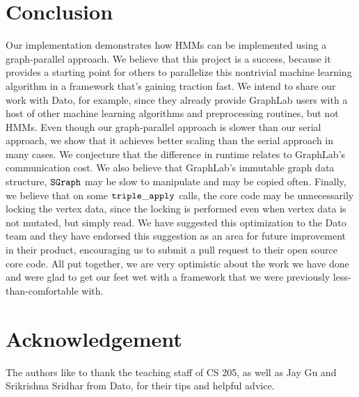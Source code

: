\section{Conclusion}

Our implementation demonstrates how HMMs can be implemented using a
graph-parallel approach.  We believe that this project is a success, because it provides a starting point for others to parallelize this nontrivial machine learning algorithm in a framework that's gaining traction fast.   We intend to share our work with Dato, for example, since they already provide GraphLab users with a host of other machine learning algorithms and preprocessing routines, but not HMMs.  Even though our graph-parallel approach is slower than
our serial approach, we show that it achieves better scaling than the serial
approach in many cases. We conjecture that the difference in runtime relates to GraphLab's communication cost.  We also believe that GraphLab's immutable graph data structure, $\tt{SGraph}$ may be slow to manipulate and may be copied often.  Finally, we  believe that on some $\tt{triple\_apply}$ calls, the core code may be unnecessarily locking the vertex data, since the locking is performed even when vertex data is not mutated, but simply read.   We have suggested this optimization to the Dato team and they have endorsed this suggestion as an area for future improvement in their product, encouraging us to submit a pull request to their open source core code.  All put together, we are very optimistic about the work we have done and were glad to get our feet wet with a framework that we were previously less-than-comfortable with.
\section*{Acknowledgement}

The authors like to thank the teaching staff of CS 205, as well as Jay Gu and
Srikrishna Sridhar from Dato, for their tips and helpful advice.
